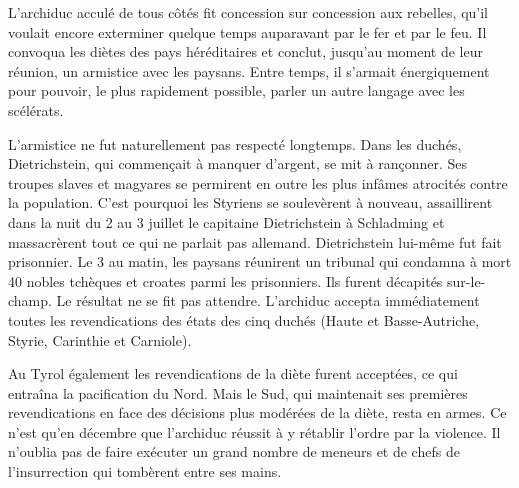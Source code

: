 \documentclass[french,twoside]{book} %
\begin{document}
L’archiduc acculé de tous côtés fit concession sur concession aux rebelles, qu’il voulait encore exterminer quelque temps auparavant par le fer et par le feu. Il convoqua les diètes des pays héréditaires et conclut, jusqu’au moment de leur réunion, un armistice avec les paysans. Entre temps, il s’armait énergiquement pour pouvoir, le plus rapidement possible, parler un autre langage avec les scélérats.\par
L’armistice ne fut naturellement pas respecté longtemps. Dans les duchés, Dietrichstein, qui commençait à manquer d’argent, se mit à rançonner. Ses troupes slaves et magyares se permirent en outre les plus infâmes atrocités contre la population. C’est pourquoi les Styriens se soulevèrent à nouveau, assaillirent dans la nuit du 2 au 3 juillet le capitaine Dietrichstein à Schladming et massacrèrent tout ce qui ne parlait pas allemand. Dietrichstein lui-même fut fait prisonnier. Le 3 au matin, les paysans réunirent un tribunal qui condamna à mort 40 nobles tchèques et croates parmi les prisonniers. Ils furent décapités sur-le-champ. Le résultat ne se fit pas attendre. L’archiduc accepta immédiatement toutes les revendications des états des cinq duchés (Haute et Basse-Autriche, Styrie, Carinthie et Carniole).\par
Au Tyrol également les revendications de la diète furent acceptées, ce qui entraîna la pacification du Nord. Mais le Sud, qui maintenait ses premières revendications en face des décisions plus modérées de la diète, resta en armes. Ce n’est qu’en décembre que l’archiduc réussit à y rétablir l’ordre par la violence. Il n’oublia pas de faire exécuter un grand nombre de meneurs et de chefs de l’insurrection qui tombèrent entre ses mains.\par
\end{document}
